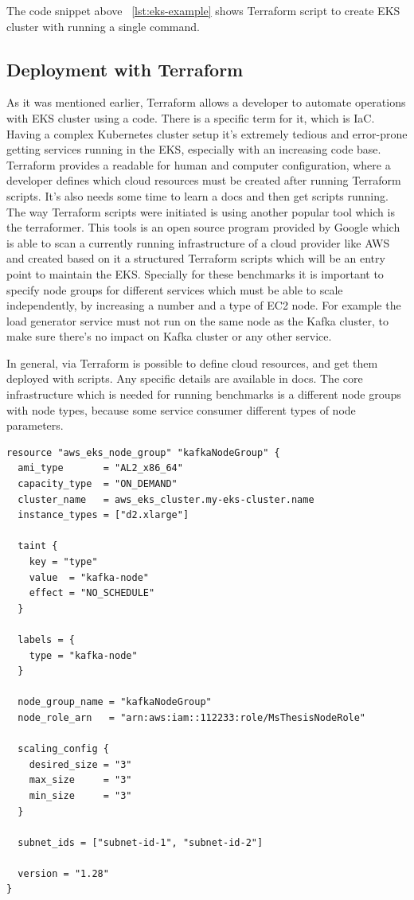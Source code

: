 The code snippet above ~\ref{lst:eks-example} shows Terraform script to
create EKS cluster with running a single command.



\subsection{Deployment with Terraform}\label{subsec:deployment-with-terraform}
As it was mentioned earlier, Terraform allows a developer to automate
operations with EKS cluster using a code.
There is a specific term for it, which is IaC.
Having a complex Kubernetes cluster setup it's extremely tedious and error-prone
getting services running in the EKS, especially with an increasing code base.
Terraform provides a readable for human and computer configuration, where a developer
defines which cloud resources must be created after running Terraform scripts.
It's also needs some time to learn a docs and then get scripts running.
The way Terraform scripts were initiated is using another popular tool which is
the terraformer.
This tools is an open source program provided by Google which is able to scan a currently
running infrastructure of a cloud provider like AWS and created based on it a
structured Terraform scripts which will be an entry point to maintain the EKS.
Specially for these benchmarks it is important to specify node groups
for different services which must be able to scale independently, by increasing
a number and a type of EC2 node.
For example the load generator service must not run on the same node as the Kafka cluster,
to make sure there's no impact on Kafka cluster or any other service.

In general, via Terraform is possible to define cloud resources, and get them deployed with
scripts.
Any specific details are available in docs.
The core infrastructure which is needed for running benchmarks is a different node groups with node types,
because some service consumer different types of node parameters.

\begin{lstlisting}[label={lst:ter-kafka}]
resource "aws_eks_node_group" "kafkaNodeGroup" {
  ami_type       = "AL2_x86_64"
  capacity_type  = "ON_DEMAND"
  cluster_name   = aws_eks_cluster.my-eks-cluster.name
  instance_types = ["d2.xlarge"]

  taint {
    key = "type"
    value  = "kafka-node"
    effect = "NO_SCHEDULE"
  }

  labels = {
    type = "kafka-node"
  }

  node_group_name = "kafkaNodeGroup"
  node_role_arn   = "arn:aws:iam::112233:role/MsThesisNodeRole"

  scaling_config {
    desired_size = "3"
    max_size     = "3"
    min_size     = "3"
  }

  subnet_ids = ["subnet-id-1", "subnet-id-2"]

  version = "1.28"
}
\end{lstlisting}


